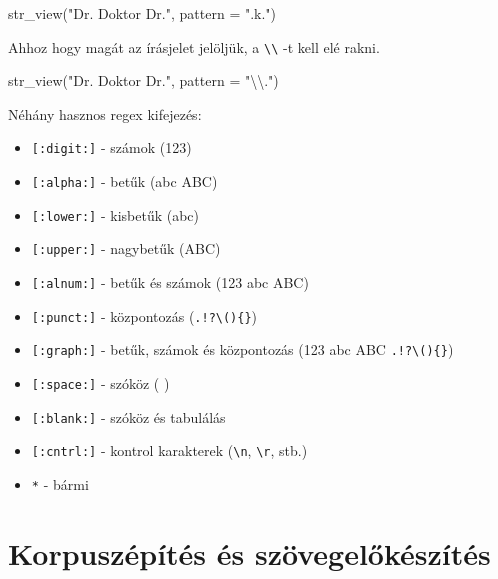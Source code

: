 \documentclass[
]{book}
\newenvironment{Shaded}{\begin{snugshade}}{\end{snugshade}}
\newcommand{\AttributeTok}[1]{\textcolor[rgb]{0.77,0.63,0.00}{#1}}
\newcommand{\FunctionTok}[1]{\textcolor[rgb]{0.00,0.00,0.00}{#1}}
\newcommand{\NormalTok}[1]{#1}
\newcommand{\SpecialCharTok}[1]{\textcolor[rgb]{0.00,0.00,0.00}{#1}}
\newcommand{\StringTok}[1]{\textcolor[rgb]{0.31,0.60,0.02}{#1}}
\providecommand{\tightlist}{%
  \setlength{\itemsep}{0pt}\setlength{\parskip}{0pt}}
\begin{document}
\begin{Shaded}
\begin{Highlighting}[]
\FunctionTok{str\_view}\NormalTok{(}\StringTok{"Dr. Doktor Dr."}\NormalTok{, }\AttributeTok{pattern =} \StringTok{".k."}\NormalTok{)}
\end{Highlighting}
\end{Shaded}

Ahhoz hogy magát az írásjelet jelöljük, a
\texttt{\textbackslash{}\textbackslash{}} -t kell elé rakni.

\begin{Shaded}
\begin{Highlighting}[]
\FunctionTok{str\_view}\NormalTok{(}\StringTok{"Dr. Doktor Dr."}\NormalTok{, }\AttributeTok{pattern =} \StringTok{"}\SpecialCharTok{\textbackslash{}\textbackslash{}}\StringTok{."}\NormalTok{)}
\end{Highlighting}
\end{Shaded}

Néhány hasznos regex kifejezés:

\begin{itemize}
\tightlist
\item
  \texttt{{[}:digit:{]}} - számok (123)
\item
  \texttt{{[}:alpha:{]}} - betűk (abc ABC)
\item
  \texttt{{[}:lower:{]}} - kisbetűk (abc)
\item
  \texttt{{[}:upper:{]}} - nagybetűk (ABC)
\item
  \texttt{{[}:alnum:{]}} - betűk és számok (123 abc ABC)
\item
  \texttt{{[}:punct:{]}} - központozás
  (\texttt{.!?\textbackslash{}()\{\}})
\item
  \texttt{{[}:graph:{]}} - betűk, számok és központozás (123 abc ABC
  \texttt{.!?\textbackslash{}()\{\}})
\item
  \texttt{{[}:space:{]}} - szóköz ( )
\item
  \texttt{{[}:blank:{]}} - szóköz és tabulálás
\item
  \texttt{{[}:cntrl:{]}} - kontrol karakterek
  (\texttt{\textbackslash{}n}, \texttt{\textbackslash{}r}, stb.)
\item
  \texttt{*} - bármi
\end{itemize}

\hypertarget{korpuszuxe9puxedtuxe9s-uxe9s-szuxf6vegelux151kuxe9szuxedtuxe9s}{%
\chapter{Korpuszépítés és
szövegelőkészítés}\label{korpuszuxe9puxedtuxe9s-uxe9s-szuxf6vegelux151kuxe9szuxedtuxe9s}}
\end{document}
